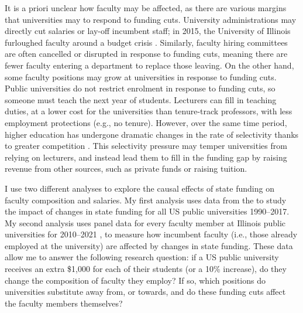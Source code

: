 It is a priori unclear how faculty may be affected, as there are various margins that universities may to respond to funding cuts.
University administrations may directly cut salaries or lay-off incumbent staff; in 2015, the University of Illinois furloughed faculty around a budget crisis \citep{furlough2010}.
Similarly, faculty hiring committees are often cancelled or disrupted in response to funding cuts, meaning there are fewer faculty entering a department to replace those leaving.
On the other hand, some faculty positions may grow at universities in response to funding cuts.
Public universities do not restrict enrolment in response to funding cuts, so someone must teach the next year of students.
Lecturers can fill in teaching duties, at a lower cost for the universities than tenure-track professors, with less employment protections (e.g., no tenure).
However, over the same time period, higher education has undergone dramatic changes in the rate of selectivity thanks to greater competition \citep{hoxby2009changing}.
This selectivity pressure may temper universities from relying on lecturers, and instead lead them to fill in the funding gap by raising revenue from other sources, such as private funds or raising tuition.

I use two different analyses to explore the causal effects of state funding on faculty composition and salaries.
My first analysis uses data from the \cite{ipeds} to study the impact of changes in state funding for all US public universities 1990--2017.
My second analysis uses panel data for every faculty member at Illinois public universities for 2010--2021 \citep{ibhed}, to measure how incumbent faculty (i.e., those already employed at the university) are affected by changes in state funding.
These data allow me to answer the following research question: if a US public university receives an extra \$1,000 for each of their students (or a 10\% increase), do they change the composition of faculty they employ?
If so, which positions do universities substitute away from, or towards, and do these funding cuts affect the faculty members themselves?

